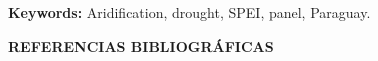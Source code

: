 \documentclass[12pt,a4paper,oneside]{book}
\begin{document}
\vspace{0.8cm}

\noindent \textbf{Keywords:} Aridification, drought, SPEI, panel, Paraguay.
\endgroup
\clearpage

\tableofcontents
\clearpage

\listoftables
\clearpage

\listoffigures
\clearpage

\onehalfspacing







\cleardoublepage
{} %
\sloppy



\begin{center}
    {\fontsize{16pt}{20pt}\selectfont\bfseries REFERENCIAS BIBLIOGRÁFICAS\par}
\end{center}
\vspace{-1.5cm} %

\begingroup
  \singlespacing %
  
  \renewcommand{\refname}{}
  \renewcommand{\bibname}{}
  
  \let\oldbibitem\bibitem
  \renewcommand{\bibitem}[2][]{\vspace{\baselineskip}\oldbibitem[#1]{#2}}
  
\end{document}
